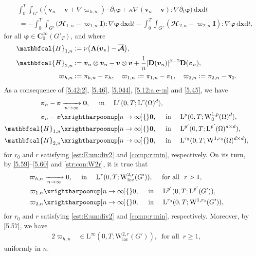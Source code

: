 \documentclass[12pt,reqno]{amsart}
\numberwithin{equation}{section}
\let\originalleft\left
\let\originalright\right
\renewcommand{\left}{\mathopen{}\mathclose\bgroup\originalleft}
\renewcommand{\right}{\aftergroup\egroup\originalright}
\theoremstyle{definition}
\def\1{\Omega}
\def\dxt{\,\mathrm{d}\boldsymbol{x}\mathrm{d}t}
\def\W{\mathrm{W}}
\def\loc{\mathrm{loc}}
\def\L{\mathrm{L}}
\def\vv{\boldsymbol{v}}
\def\bfC{\mathbf{C}}
\def\bfI{\mathbf{I}}
\def\bfD{\mathbf{D}}
\def\bfA{\mathbf{A}}
\def\bf0{\mathbf{0}}
\def\bmcA{\boldsymbol{\mathcal{A}}}
\def\bfi{\boldsymbol{\varphi}}
\def\bcH{\mathbfcal{H}}
\begin{document}
{
\begin{equation}\label{5.86}
\begin{split}
& -\!\int_{0}^{T}\!\!\!\!\int_{G'}\Big((\vv_n-\vv+\nabla\varpi_{h,n})\cdot{\partial_t\bfi} + \kappa\nabla(\vv_n-\vv):\nabla{\partial_t\bfi}\Big)\dxt  \\
& \quad = -\!\int_{0}^{T}\!\!\!\!\int_{G'}\big(\bcH_{1,n}-\varpi_{1,n}\bfI\big):\nabla\bfi  \dxt
-\!\int_{0}^{T}\!\!\!\!\int_{G'}(\bcH_{2,n}-\varpi_{2,n}\bfI):\nabla\bfi \dxt,
\end{split}
\end{equation}
for all $\bfi \in \bfC^\infty_0(G'_T)$, and where
\begin{align}	 \label{def:theta:hn1}
		\bcH_{1,n}&:=\nu\left(\bfA(\vv_n)-\overline{\bmcA}\right),  \\  \label{def:theta:hn2}
		\bcH_{2,n}&:=\vv_n\otimes \vv_n-\vv\otimes\vv + \frac{1}{n}|\bfD(\vv_n)|^{\beta-2}\bfD(\vv_n),  \\
		\varpi_{h,n}&:=\pi_{h,n}-\pi_h,\quad \varpi_{1,n}:=\pi_{1,n}-\pi_1,\quad \varpi_{2,n}:=\pi_{2,n}-\pi_2. \label{def:theta:hn}
	\end{align}
As a consequence of \eqref{5.42:2}, \eqref{5.46}, \eqref{5.044}, \eqref{5.12:a.e-:n} and \eqref{5.45}, we have
\begin{alignat}{2}
\label{5.75}
	\vv_n -\vv	&	 \xrightarrow[n\to\infty]{} \bf0,\quad \text{ in }\quad \L^r(0,T;\L^r(\1)^d),\\
	\label{5.74}
	\vv_n -\vv	&	 \xrightharpoonup[n\to\infty]{} \bf0,\quad \text{ in }\quad \L^p(0,T;\W_0^{1,p}(\1)^d),\\
	\label{5.76}
	\bcH_{1,n}&\xrightharpoonup[n\to\infty]{} \bf0,\quad \text{ in }\quad \L^{p'}(0,T;\L^{p'}(\1)^{d\times d}),\\
	\label{5.77}
	\bcH_{2,n}&\xrightharpoonup[n\to\infty]{} \bf0,\quad \text{ in }\quad \L^{r_0}(0,T;\W^{1,r_0}(\1)^{d\times d}),
\end{alignat}
for $r_0$ and $r$ satisfying \eqref{est:E:un:div2} and \eqref{comp:r:min}, respectively.
On its turn, by \eqref{5.59}--\eqref{5.60} and \eqref{str:con:W2r}, it is true that
\begin{alignat}{2}
	\label{5.79}
	\varpi_{h,n}&\xrightarrow[n\to\infty]{} 0,\quad \text{ in }\quad {\L^r(0,T;\W^{2,r}_{\rm{loc}}(G')),\quad \text{ for all }\ r>1},\\
	\label{5.80}
	\varpi_{1,n}&\xrightharpoonup[n\to\infty]{} 0,\quad \text{ in }\quad  \L^{p'}(0,T;\L^{p'}(G')),\\
	\label{5.81}
	\varpi_{2,n}&\xrightharpoonup[n\to\infty]{} 0,\quad \text{ in }\quad \L^{r_0}(0,T;\W^{1,r_0}(G')),
\end{alignat}for $r_0$ and $r$ satisfying \eqref{est:E:un:div2} and \eqref{comp:r:min}, respectively.
Moreover, by \eqref{5.57}, we have
\begin{alignat*}{2}
	\varpi_{h,n}&\in \L^\infty(0,T;\W^{2,r}_\loc(G')),\  \text{ for all }\  r\geq 1,
\end{alignat*}
uniformly in $n$.

}
\end{document}

